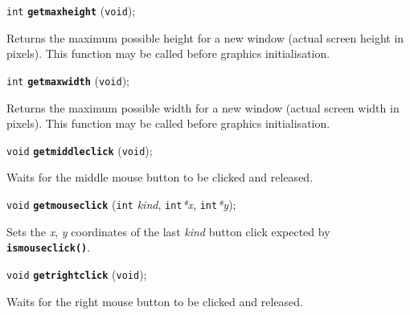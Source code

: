 \documentclass[a4paper,12pt]{article}
\newcommand{\V}{\texttt{void}}      %
\newcommand{\I}{\texttt{int}}       %
\newcommand{\func}[1]{\textbf{\texttt{#1}}}  %
\newcommand{\A}[1]{\emph{#1}}       %
\newenvironment{bgi}
{ %
  \begin{snugshade}
}
{ %
  \end{snugshade}
}
\begin{document}

\label{sec:getmaxheight}

\begin{bgi}
\I{} \func{getmaxheight} (\V{});
\end{bgi}

Returns the maximum possible height for a new window (actual screen
height in pixels). This function may be called before graphics
initialisation.


\label{sec:getmaxwidth}

\begin{bgi}
\I{} \func{getmaxwidth} (\V{});
\end{bgi}

Returns the maximum possible width for a new window (actual screen
width in pixels). This function may be called before graphics
initialisation.


\label{sec:getmiddleclick}

\begin{bgi}
\V{} \func{getmiddleclick} (\V{});
\end{bgi}

Waits for the middle mouse button to be clicked and released.


\label{sec:getmouseclick}

\begin{bgi}
\V{} \func{getmouseclick} (\I{} \A{kind}, \I{}\A{*x}, \I{}\A{*y});
\end{bgi}

Sets the \A{x}, \A{y} coordinates of the last \A{kind} button click
expected by \func{ismouseclick()}.


\label{sec:getrightclick}

\begin{bgi}
\V{} \func{getrightclick} (\V{});
\end{bgi}

Waits for the right mouse button to be clicked and released.

\end{document}
